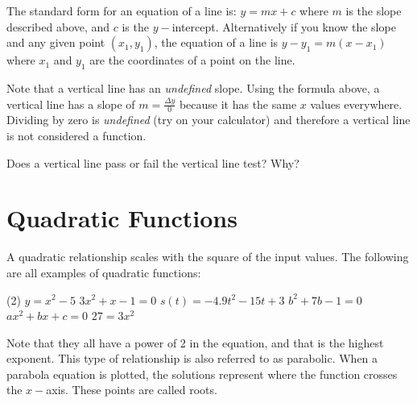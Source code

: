  The standard form for an equation of a line is: $y =m x +c$ where $m$ is the slope described above, and $c$ is the $y-$intercept. Alternatively if you know the slope and any given point $(x_1,y_1)$, the equation of a line is $y -y_{1} =m (x -x_{1})$ where $x_1$ and $y_1$ are the coordinates of a point on the line.

Note that a vertical line has an \textit{undefined} slope. Using the formula above, a vertical line has a slope of $m=\frac{\Delta y}{0}$ because it has the same $x$ values everywhere. Dividing by zero is \textit{undefined} (try on your calculator) and therefore a vertical line is not considered a function.

\exercise Does a vertical line pass or fail the vertical line test? Why?

\section*{Quadratic Functions}
A quadratic relationship scales with the square of the input values. The following are all examples of quadratic functions:
 \begin{tasks}[style=itemize](2)
 	\task $ y=x^2-5$
	\task $ 3x^2+x-1=0$
 	\task $ s(t)=-4.9t^2-15t+3$
 	\task $ b^2+7b-1=0$
 	\task $ ax^2+bx+c=0$
 	\task $ 27=3x^2$
 \end{tasks}
Note that they all have a power of 2 in the equation, and that is the highest exponent. This type of relationship is also referred to as parabolic. When a parabola equation is plotted, the solutions represent where the function crosses the $x-$axis. These points are called roots.

